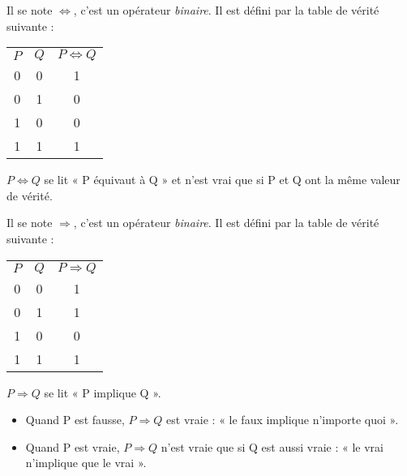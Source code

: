 \begin{definition}
	Il se note $\Leftrightarrow$, c'est un opérateur \textit{binaire}.
	Il est défini par la table de vérité suivante :
	\begin{center}
		\tabstyled
		\begin{tabular}{|c|c|c|}
			\rowcolor{UGLiGreen}
			\ccell $P$ & \ccell $Q$ & \ccell $P\Leftrightarrow Q$ \\
			0                  & 0                  & 1                                   \\
			0                  & 1                  & 0                                   \\
			1                  & 0                  & 0                                   \\
			1                  & 1                  & 1                                   \\
		\end{tabular}
	\end{center}
	$P\Leftrightarrow Q$ se lit « P équivaut à Q » et n'est vrai que si P et Q ont la même valeur de vérité.
\end{definition}


\begin{definition}[ : implication]
	Il se note $\Rightarrow$, c'est un opérateur \textit{binaire}.
	Il est défini par la table de vérité suivante :
	\begin{center}
		\tabstyled
		\begin{tabular}{|c|c|c|}
			\rowcolor{UGLiGreen}
			\ccell\boldmath$P$ & \ccell\boldmath$Q$ & \ccell\boldmath$P\Rightarrow Q$ \\
			0                  & 0                  & 1                               \\
			0                  & 1                  & 1                               \\
			1                  & 0                  & 0                               \\
			1                  & 1                  & 1                               \\
		\end{tabular}
	\end{center}
	$P\Rightarrow Q$ se lit « P implique Q ».
	\begin{itemize}
		\item 	Quand P est fausse, $P\Rightarrow Q$ est vraie : « le faux implique n'importe quoi ».
		\item 	Quand P est vraie, $P\Rightarrow Q$ n'est vraie que si Q est aussi vraie : « le vrai n'implique que le vrai ».
	\end{itemize}
\end{definition}

